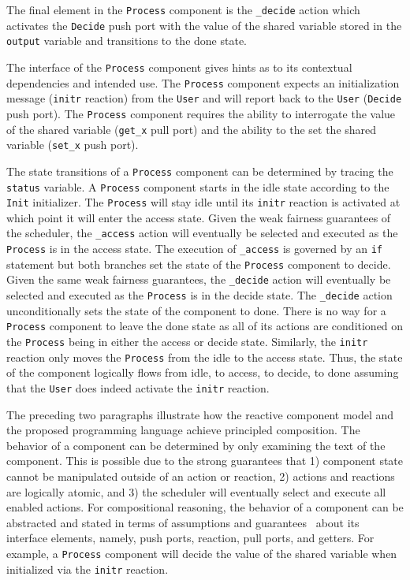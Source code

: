 The final element in the \verb+Process+ component is the \verb+_decide+ action which activates the \verb+Decide+ push port with the value of the shared variable stored in the \verb+output+ variable and transitions to the done state.

The interface of the \verb+Process+ component gives hints as to its contextual dependencies and intended use.
The \verb+Process+ component expects an initialization message (\verb+initr+ reaction) from the \verb+User+ and will report back to the \verb+User+ (\verb+Decide+ push port).
The \verb+Process+ component requires the ability to interrogate the value of the shared variable (\verb+get_x+ pull port) and the ability to the set the shared variable (\verb+set_x+ push port).

The state transitions of a \verb+Process+ component can be determined by tracing the \verb+status+ variable.
A \verb+Process+ component starts in the idle state according to the \verb+Init+ initializer.
The \verb+Process+ will stay idle until its \verb+initr+ reaction is activated at which point it will enter the access state.
Given the weak fairness guarantees of the scheduler, the \verb+_access+ action will eventually be selected and executed as the \verb+Process+ is in the access state.
The execution of \verb+_access+ is governed by an \verb+if+ statement but both branches set the state of the \verb+Process+ component to decide.
Given the same weak fairness guarantees, the \verb+_decide+ action will eventually be selected and executed as the \verb+Process+ is in the decide state.
The \verb+_decide+ action unconditionally sets the state of the component to done.
There is no way for a \verb+Process+ component to leave the done state as all of its actions are conditioned on the \verb+Process+ being in either the access or decide state.
Similarly, the \verb+initr+ reaction only moves the \verb+Process+ from the idle to the access state.
Thus, the state of the component logically flows from idle, to access, to decide, to done assuming that the \verb+User+ does indeed activate the \verb+initr+ reaction.

The preceding two paragraphs illustrate how the reactive component model and the proposed programming language achieve principled composition.
The behavior of a component can be determined by only examining the text of the component.
This is possible due to the strong guarantees that 1) component state cannot be manipulated outside of an action or reaction, 2) actions and reactions are logically atomic, and 3) the scheduler will eventually select and execute all enabled actions.
For compositional reasoning, the behavior of a component can be abstracted and stated in terms of assumptions and guarantees~\cite{Jones:1983:TST:69575.69577} about its interface elements, namely, push ports, reaction, pull ports, and getters.
For example, a \verb+Process+ component will decide the value of the shared variable when initialized via the \verb+initr+ reaction.

